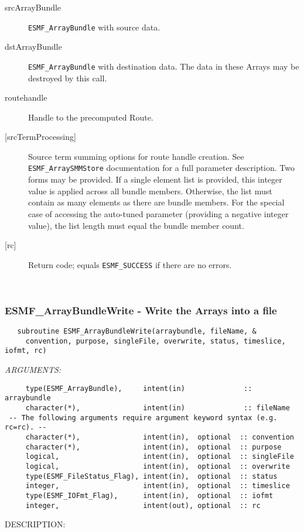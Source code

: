      \begin{description}
     \item [srcArrayBundle]
       {\tt ESMF\_ArrayBundle} with source data.
     \item [dstArrayBundle]
       {\tt ESMF\_ArrayBundle} with destination data. The data in these Arrays
       may be destroyed by this call.
     \item [routehandle]
       Handle to the precomputed Route.
     \item [{[srcTermProcessing]}]
         Source term summing options for route handle creation. See
         {\tt ESMF\_ArraySMMStore} documentation for a full parameter description.
         Two forms may be provided. If a single element list is provided, this
         integer value is applied across all bundle members. Otherwise, the list must
         contain as many elements as there are bundle members. For the special case
         of accessing the auto-tuned parameter (providing a negative integer value),
         the list length must equal the bundle member count.
     \item [{[rc]}]
       Return code; equals {\tt ESMF\_SUCCESS} if there are no errors.
     \end{description}
   
 
\mbox{}\hrulefill\ 
 
\subsubsection [ESMF\_ArrayBundleWrite] {ESMF\_ArrayBundleWrite - Write the Arrays into a file}


   \label{api:ArrayBundleWrite}
 
\begin{verbatim}   subroutine ESMF_ArrayBundleWrite(arraybundle, fileName, &
     convention, purpose, singleFile, overwrite, status, timeslice, iofmt, rc)\end{verbatim}{\em ARGUMENTS:}
\begin{verbatim}     type(ESMF_ArrayBundle),     intent(in)              :: arraybundle
     character(*),               intent(in)              :: fileName
 -- The following arguments require argument keyword syntax (e.g. rc=rc). --
     character(*),               intent(in),  optional  :: convention
     character(*),               intent(in),  optional  :: purpose
     logical,                    intent(in),  optional  :: singleFile
     logical,                    intent(in),  optional  :: overwrite
     type(ESMF_FileStatus_Flag), intent(in),  optional  :: status
     integer,                    intent(in),  optional  :: timeslice
     type(ESMF_IOFmt_Flag),      intent(in),  optional  :: iofmt
     integer,                    intent(out), optional  :: rc  \end{verbatim}
{\sf DESCRIPTION:\\ }


